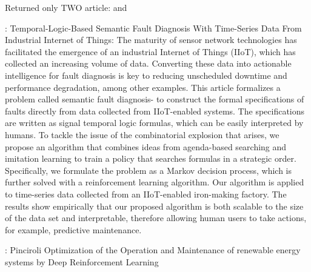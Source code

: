\documentclass{article}
\begin{document}
Returned only TWO article: \cite{Chen-2021-Temporal} and \cite{Pinciroli2022-752} 	

\cite{Chen-2021-Temporal}: Temporal-Logic-Based Semantic Fault Diagnosis With Time-Series Data From Industrial Internet of Things:
The maturity of sensor network technologies has facilitated the emergence of an industrial Internet of Things (IIoT), which has collected an increasing volume of data. Converting these data into actionable intelligence for fault diagnosis is key to reducing unscheduled downtime and performance degradation, among other examples. This article formalizes a problem called semantic fault diagnosis- to construct the formal specifications of faults directly from data collected from IIoT-enabled systems. The specifications are written as signal temporal logic formulas, which can be easily interpreted by humans. To tackle the issue of the combinatorial explosion that arises, we propose an algorithm that combines ideas from agenda-based searching and imitation learning to train a policy that searches formulas in a strategic order. Specifically, we formulate the problem as a Markov decision process, which is further solved with a reinforcement learning algorithm. Our algorithm is applied to time-series data collected from an IIoT-enabled iron-making factory. The results show empirically that our proposed algorithm is both scalable to the size of the data set and interpretable, therefore allowing human users to take actions, for example, predictive maintenance.

\cite{Pinciroli2022-752}: Pinciroli Optimization of the Operation and Maintenance of renewable energy systems by Deep Reinforcement Learning

\end{document}
